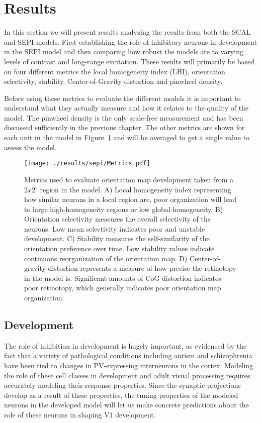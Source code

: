 \section{Results}

In this section we will present results analyzing the results from
both the SCAL and SEPI models. First establishing the role of
inhibitory neurons in development in the SEPI model and then comparing
how robust the models are to varying levels of contrast and long-range
excitation. These results will primarily be based on four different
metrics the local homogeneity index (LHI), orientation selectivity,
stability, Center-of-Gravity distortion and pinwheel density.

Before using these metrics to evaluate the different models it is
important to understand what they actually measure and how it relates
to the quality of the model. The pinwheel density is the only
scale-free measurement and has been discussed sufficiently in the
previous chapter. The other metrics are shown for each unit in the
model in Figure~\ref{MetricPlots} and will be averaged to get a single
value to assess the model.

\begin{figure}
  \texttt{[image: ./results/sepi/Metrics.pdf]}
  \caption[Metrics used to evaluate orientation map
    development.]{Metrics used to evaluate orientation map
    development taken from a $2x2^\circ$ region in the model. A)
  Local homogeneity index representing how similar neurons in a
  local region are, poor organization will lead to large
  high-homogeneity regions or low global homogeneity. B) Orientation
  selectivity measures the overall selectivity of the neurons. Low
  mean selectivity indicates poor and unstable development. C)
  Stability measures the self-similarity of the orientation
  preference over time. Low stability values indicate continuous
  reorganization of the orientation map. D) Center-of-gravity
  distortion represents a measure of how precise the retinotopy in
  the model is. Significant amounts of CoG distortion indicates poor
  retinotopy, which generally indicates poor orientation map
  organization.}
	\label{MetricPlots}
\end{figure}


\subsection{Development}

The role of inhibition in development is hugely important, as
evidenced by the fact that a variety of pathological conditions
including autism \citep{Wohr2015} and schizophrenia \citep{Lewis2012}
have been tied to changes in PV-expressing interneurons in the
cortex. Modeling the role of these cell classes in development and
adult visual processing requires accurately modeling their response
properties. Since the synaptic projections develop as a result of
these properties, the tuning properties of the modeled neurons in the
developed model will let us make concrete predictions about the role
of these neurons in shaping V1 development.

